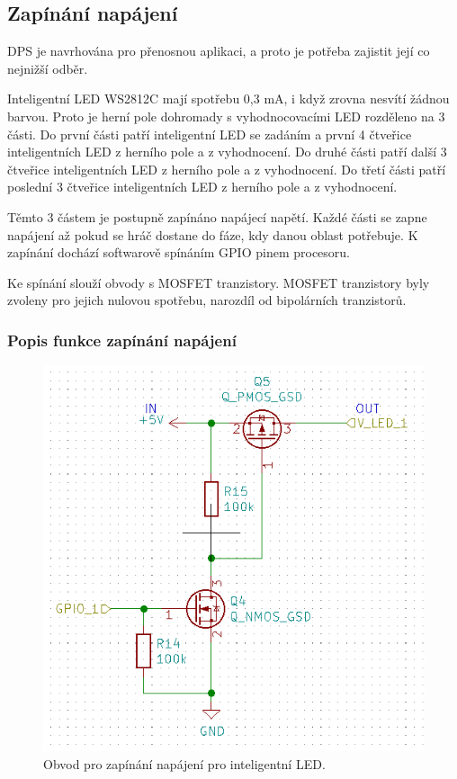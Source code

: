 \subsection{Zapínání napájení}
DPS je navrhována pro přenosnou aplikaci, a proto je potřeba zajistit její co nejnižší odběr. 

Inteligentní LED WS2812C mají spotřebu 0,3 mA, i když zrovna nesvítí žádnou barvou. Proto je herní pole dohromady s 
vyhodnocovacími LED rozděleno na 3 části. Do první části patří inteligentní LED se zadáním a první 4 čtveřice inteligentních LED 
z herního pole a z vyhodnocení. Do druhé části patří další 3 čtveřice inteligentních LED z herního pole a z vyhodnocení. 
Do třetí části patří poslední 3 čtveřice inteligentních LED z herního pole a z vyhodnocení.

Těmto 3 částem je postupně zapínáno napájecí napětí. Každé části se zapne napájení až pokud se hráč dostane do fáze, kdy 
danou oblast potřebuje. K zapínání dochází softwarově spínáním GPIO pinem procesoru.

Ke spínání slouží obvody s MOSFET tranzistory. MOSFET tranzistory byly zvoleny pro jejich nulovou spotřebu, narozdíl od 
bipolárních tranzistorů. 

\subsubsection{Popis funkce zapínání napájení}

\begin{figure}[!h]
  \begin{center}
    \includegraphics[scale=0.8]{obrazky/Zapinani_napajeni_LED.png}
  \end{center}
  \caption[Obvod pro zapínání napájení pro inteligentní LED]{Obvod pro zapínání napájení pro inteligentní LED.}
\end{figure}

